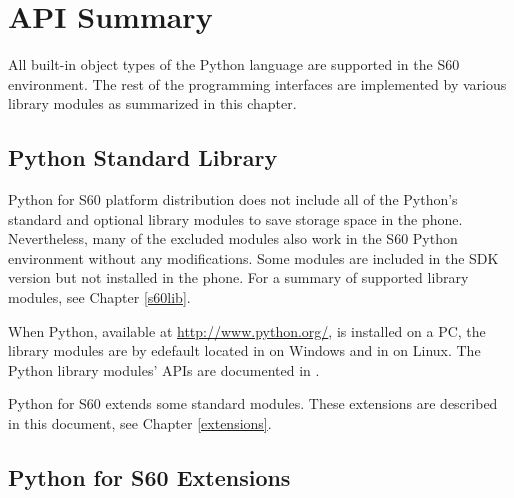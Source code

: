 %
%
%

\chapter{API Summary}
\label{sec:summary}

All built-in object types of the Python language are supported in the
S60 environment. The rest of the programming interfaces are
implemented by various library modules as summarized in this chapter.

\section{Python Standard Library}
\label{subsec:python}

Python for S60 platform distribution does not include all of the 
Python's standard and optional library modules to save storage space in the 
phone. Nevertheless, many of the excluded modules also work in the S60 
Python environment without any modifications. Some modules are included in 
the SDK version but not installed in the phone. For a summary of supported 
library modules, see Chapter \ref{s60lib}.

When Python, available at \url{http://www.python.org/}, is installed on a PC, the 
library modules are by edefault located in 
on Windows and in  on Linux. The Python library 
modules' APIs are documented in \cite{PyLibRef}.

Python for S60 extends some standard modules. These extensions are 
described in this document, see Chapter \ref{extensions}.

\section{Python for S60 Extensions}
\label{sec:sumext}

